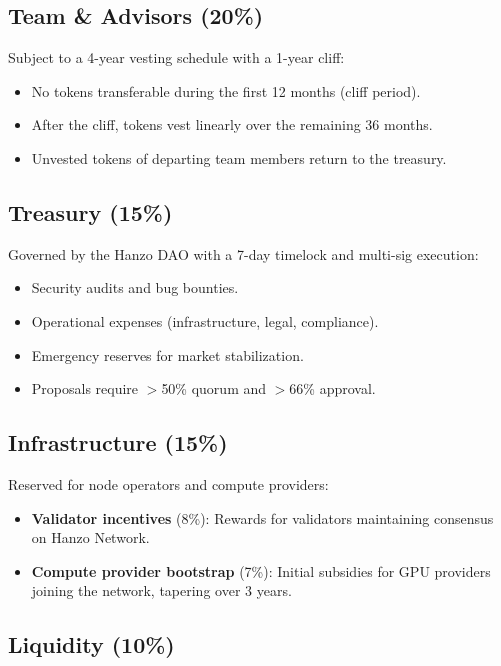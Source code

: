 \subsection{Team \& Advisors (20\%)}

Subject to a 4-year vesting schedule with a 1-year cliff:

\begin{itemize}[leftmargin=1.1em]
    \item No tokens transferable during the first 12 months (cliff period).
    \item After the cliff, tokens vest linearly over the remaining 36 months.
    \item Unvested tokens of departing team members return to the treasury.
\end{itemize}

\subsection{Treasury (15\%)}

Governed by the Hanzo DAO with a 7-day timelock and multi-sig execution:

\begin{itemize}[leftmargin=1.1em]
    \item Security audits and bug bounties.
    \item Operational expenses (infrastructure, legal, compliance).
    \item Emergency reserves for market stabilization.
    \item Proposals require $>$50\% quorum and $>$66\% approval.
\end{itemize}

\subsection{Infrastructure (15\%)}

Reserved for node operators and compute providers:

\begin{itemize}[leftmargin=1.1em]
    \item \textbf{Validator incentives} (8\%): Rewards for validators maintaining
    consensus on Hanzo Network.
    \item \textbf{Compute provider bootstrap} (7\%): Initial subsidies for GPU
    providers joining the network, tapering over 3 years.
\end{itemize}

\subsection{Liquidity (10\%)}

